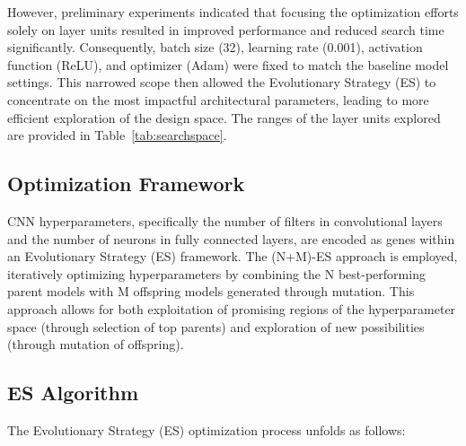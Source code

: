 \documentclass[conference]{IEEEtran}
\begin{document}
However, preliminary experiments indicated that focusing the optimization efforts solely on layer units resulted in improved performance and reduced search time significantly. Consequently, batch size (32), learning rate (0.001), activation function (ReLU), and optimizer (Adam) were fixed to match the baseline model settings. This narrowed scope then allowed the Evolutionary Strategy (ES) to concentrate on the most impactful architectural parameters, leading to more efficient exploration of the design space. The ranges of the layer units explored are provided in Table~\ref{tab:searchspace}.

\subsection{Optimization Framework}

CNN hyperparameters, specifically the number of filters in convolutional layers and the number of neurons in fully connected layers, are encoded as genes within an Evolutionary Strategy (ES) framework. The (N+M)-ES approach is employed, iteratively optimizing hyperparameters by combining the N best-performing parent models with M offspring models generated through mutation. This approach allows for both exploitation of promising regions of the hyperparameter space (through selection of top parents) and exploration of new possibilities (through mutation of offspring).

\subsection{ES Algorithm}

The Evolutionary Strategy (ES) optimization process unfolds as follows:
\end{document}
